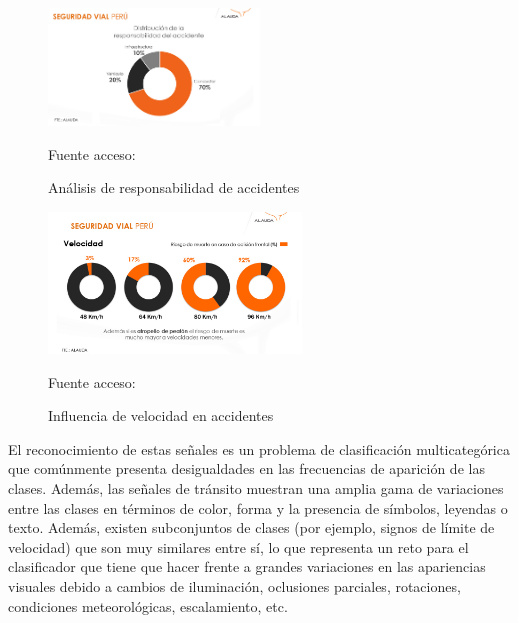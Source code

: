 	\begin{figure}[H]
	\begin{center}
	\includegraphics[width=0.5\textwidth]{images/intro/responsabilidad_cond}
	\end{center}
	\begin{center}
	\caption{\small{Análisis de responsabilidad de accidentes}}
	{\small{Fuente acceso: \cite{Gestion1}}}
	\end{center}
	\vspace{-1.5em}
	\end{figure}

	\begin{figure}[H]
	\begin{center}
	\includegraphics[width=0.6\textwidth]{images/intro/velocidad_ind}
	\end{center}
	\begin{center}
	\caption{\small{Influencia de velocidad en accidentes}}
	{\small{Fuente acceso: \cite{Gestion1}}}
	\end{center}
	\vspace{-1.5em}
	\end{figure}
	
	
	El reconocimiento de estas señales es un problema de clasificación multicategórica que comúnmente presenta desigualdades en las frecuencias de aparición de las clases. Además, las señales de tránsito muestran una amplia gama de variaciones entre las clases en términos de color, forma y la presencia de símbolos, leyendas o texto. Además, existen subconjuntos de clases (por ejemplo, signos de límite de velocidad) que son muy similares entre sí, lo que representa un reto para el clasificador que tiene que hacer frente a grandes variaciones en las apariencias visuales debido a cambios de iluminación, oclusiones parciales, rotaciones, condiciones meteorológicas, escalamiento, etc.
    

